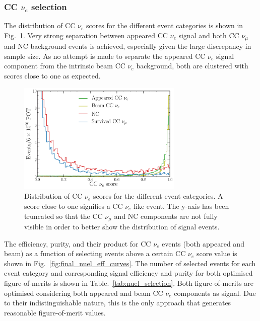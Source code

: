 \subsubsection*{CC $\nu_{e}$ selection} %

The distribution of CC $\nu_{e}$ scores for the different event categories is shown in
Fig.~\ref{fig:final_beam_nuel_outputs}. Very strong separation between appeared CC $\nu_{e}$
signal and both CC $\nu_{\mu}$ and NC background events is achieved, especially given the large
discrepancy in sample size. As no attempt is made to separate the appeared CC $\nu_{e}$ signal
component from the intrinsic beam CC $\nu_{e}$ background, both are clustered with scores close to
one as expected.

\begin{figure} %
    \includegraphics[width=0.7\textwidth]{diagrams/6-cvn/chipsnet/final_beam_nuel_outputs.pdf}
    \caption[Distribution of CC $\nu_{e}$ scores from the trained beam classification network.]
    {Distribution of CC $\nu_{e}$ scores for the different event categories. A score close to one
        signifies a CC $\nu_{e}$ like event. The y-axis has been truncated so that the CC
        $\nu_{\mu}$ and NC components are not fully visible in order to better show the
        distribution of signal events.}
    \label{fig:final_beam_nuel_outputs}
\end{figure}

The efficiency, purity, and their product for CC $\nu_{e}$ events (both appeared and beam) as a
function of selecting events above a certain CC $\nu_{e}$ score value is shown in
Fig.~\ref{fig:final_nuel_eff_curves}. The number of selected events for each event category and
corresponding signal efficiency and purity for both optimised figure-of-merits is shown in
Table.~\ref{tab:nuel_selection}. Both figure-of-merits are optimised considering both appeared and
beam CC $\nu_{e}$ components as signal. Due to their indistinguishable nature, this is the only
approach that generates reasonable figure-of-merit values.

